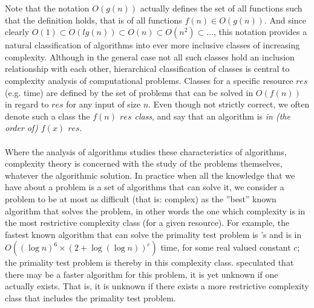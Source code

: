 	Note that the notation $O\left(g\left(n\right)\right)$ actually defines the set of all functions such that the definition holds, that is of all functions $f(n) \in O\left(g\left(n\right)\right)$.
	And since clearly $O(1) \subset O\left(lg\left(n\right)\right) \subset O\left(n\right) \subset O\left(n^2\right) \subset \ldots{} $, this notation provides a natural classification of algorithms into ever more inclusive classes of increasing complexity.
	Although in the general case not all such classes hold an inclusion relationship with each other, hierarchical classification of classes is central to complexity analysis of computational problems.
	Classes for a specific resource $res$ (e.g. time) are defined by the set of problems that can be solved in $O(f(n))$ in regard to $res$ for any input of size $n$.
	Even though not strictly correct, we often denote such a class the \emph{$f(n)$ $res$ class}, and say that an algorithm is \emph{in (the order of) $f(x)$ $res$}.


	\paragraph{}
	Where the analysis of algorithms studies these characteristics of algorithms, complexity theory is concerned with the study of the problems themselves, whatever the algorithmic solution.
	In practice when all the knowledge that we have about a problem is a set of algorithms that can solve it, we consider a problem to be at most as difficult (that is: complex)  as the ''best'' known algorithm that solves the problem, in other words the one which complexity is in the most restrictive complexity class (for a given resource).
	For example, the fastest known algorithm that can solve the primality test problem is \textcite{lenstra2002primality}'s and is in $O\left(\left(\log n\right)^6\times{}\left(2 + \log(\log n)\right)^c\right)$ time, for some real valued constant $c$; the primality test problem is thereby in this complexity class.
	\Textcite{agrawal2004primes} speculated that there may be a faster algorithm for this problem, it is yet unknown if one actually exists.
	That is, it is unknown if there exists a more restrictive complexity class that includes the primality test problem.

